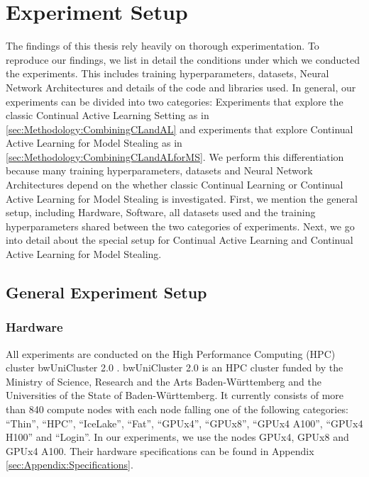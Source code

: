 
\chapter{Experiment Setup}
\label{ch:ExperimentSetup}

The findings of this thesis rely heavily on thorough experimentation. To reproduce our findings, we list in detail the
conditions under which we conducted the experiments. This includes training hyperparameters, datasets, Neural Network Architectures
and details of the code and libraries used. In general, our experiments can be divided into two categories: Experiments that explore
the classic Continual Active Learning Setting as in \ref{sec:Methodology:CombiningCLandAL} and experiments that explore Continual 
Active Learning for Model Stealing as in \ref{sec:Methodology:CombiningCLandALforMS}. We perform this differentiation because many 
training hyperparameters, datasets and Neural Network Architectures depend on the whether classic Continual Learning or Continual 
Active Learning for Model Stealing is investigated. First, we mention the general setup, including Hardware, Software, all datasets used
and the training hyperparameters shared between the two categories of experiments. Next, we go into detail about the special setup for
Continual Active Learning and Continual Active Learning for Model Stealing.

\section{General Experiment Setup}
\label{sec:ExperimentSetup:FirstSection}

\subsection{Hardware}
\label{sec:ExperimentSetup:Hardware}
All experiments are conducted on the High Performance Computing (HPC) cluster bwUniCluster 2.0 \cite{bwUnicluster}. bwUniCluster 2.0 is an HPC cluster
funded by the Ministry of Science, Research and the Arts Baden-Württemberg and the Universities of the State of Baden-Württemberg. It currently consists
of more than 840 compute nodes with each node falling one of the following categories: \enquote{Thin}, \enquote{HPC}, \enquote{IceLake}, \enquote{Fat},
\enquote{GPUx4}, \enquote{GPUx8}, \enquote{GPUx4 A100}, \enquote{GPUx4 H100} and \enquote{Login}. In our experiments, we use the nodes GPUx4, GPUx8 and
GPUx4 A100. Their hardware specifications can be found in Appendix \ref{sec:Appendix:Specifications}.


